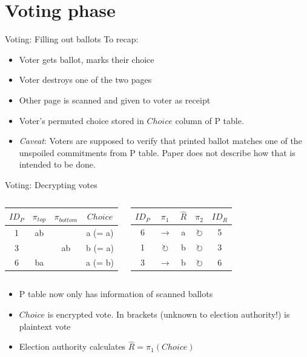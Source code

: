 \documentclass{beamer}
\begin{document}
\section{Voting phase}

\begin{frame}{Voting: Filling out ballots}
	To recap:
	\begin{itemize}
		\item Voter gets ballot, marks their choice
		\item Voter destroys one of the two pages
		\item Other page is scanned and given to voter as receipt
		\item Voter's permuted choice stored in $Choice$ column of P table.
		\item \emph{Caveat}: Voters are supposed to verify that printed
			ballot matches one of the unspoiled commitments from P
			table. Paper does not describe how that is intended to
			be done.
	\end{itemize}
\end{frame}

\begin{frame}{Voting: Decrypting votes}
	\begin{columns}
		\begin{center}
			\begin{tabular}{|c|c|c|c|}
				\hline
				$ID_P$ & $\pi_{top}$ & $\pi_{bottom}$ & $Choice$ \\
				\hline
				1 & ab &    & a (= a) \\
				3 &    & ab & b (= a) \\
				6 & ba &    & a (= b) \\
				\hline
			\end{tabular}
		\end{center}
		\begin{center}
			\begin{tabular}{|c|c|c|c|c|}
				\hline
				$ID_P$ & $\pi_1$ & $\hat{R}$ & $\pi_2$ & $ID_R$ \\
				\hline
				6 & $\rightarrow$       & a & $\circlearrowright$ & 5 \\
				1 & $\circlearrowright$ & b & $\circlearrowright$ & 3 \\
				3 & $\rightarrow$       & b & $\circlearrowright$ & 6 \\
				\hline
			\end{tabular}
		\end{center}
	\end{columns}

	\begin{itemize}
		\item P table now only has information of scanned ballots
		\item $Choice$ is encrypted vote. In brackets (unknown to election
			authority!) is plaintext vote
		\item Election authority calculates $\hat{R} = \pi_1(Choice)$
	\end{itemize}
\end{frame}
\end{document}
